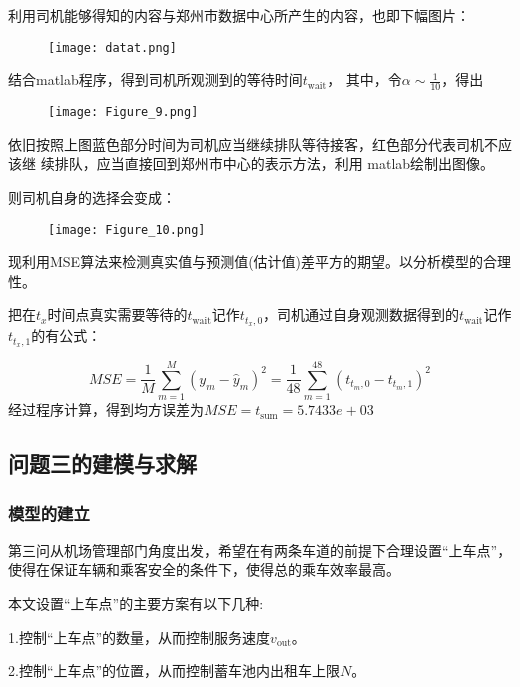 \documentclass[withoutpreface,bwprint]{cumcmthesis} %
\begin{document}
利用司机能够得知的内容与郑州市数据中心所产生的内容，也即下幅图片：\par
\begin{figure}[!h]
	\centering
	\texttt{[image: datat.png]}
	\caption{}
\end{figure}

结合matlab程序，得到司机所观测到的等待时间$t_{\mathrm{wait}}$，
其中，令$\alpha\sim\frac{1}{10}$，得出\par
\begin{figure}[!h]
	\centering
	\texttt{[image: Figure\_9.png]}
	\caption{}
\end{figure}
\newpage
依旧按照上图蓝色部分时间为司机应当继续排队等待接客，红色部分代表司机不应该继
续排队，应当直接回到郑州市中心的表示方法，利用 matlab绘制出图像。\par
则司机自身的选择会变成：\par
\begin{figure}[!h]
	\centering
	\texttt{[image: Figure\_10.png]}
	\caption{}
\end{figure}
现利用MSE算法来检测真实值与预测值(估计值)差平方的期望。以分析模型的合理性。\par 
把在$t_x$时间点真实需要等待的$t_{\mathrm{wait}}$记作$t_{t_x,0}$，司机通过自身观测数据得到的$t_{\mathrm{wait}}$记作$t_{t_x,1}$的有公式：\par 
\begin{equation}
	M S E=\frac{1}{M} \sum_{m=1}^{M}\left(y_{m}-\hat{y}_{m}\right)^{2}=\frac{1}{48} \sum_{m=1}^{48}\left(t_{t_m,0}-t_{t_m,1}\right)^{2}
\end{equation}
经过程序计算，得到均方误差为$M S E= t_{\mathrm{sum}} = 5.7433e+03 $

\newpage
\subsection{问题三的建模与求解}

\subsubsection{模型的建立}
第三问从机场管理部门角度出发，希望在有两条车道的前提下合理设置“上车点”，使得在保证车辆和乘客安全的条件下，使得总的乘车效率最高。\par
本文设置“上车点”的主要方案有以下几种:\par
1.控制“上车点”的数量，从而控制服务速度$v_{\mathrm{out}}$。\par
2.控制“上车点”的位置，从而控制蓄车池内出租车上限$N$。\par
\end{document}
